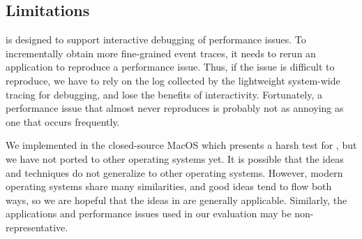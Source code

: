 \subsection{Limitations}

\xxx is designed to support interactive debugging of performance issues.  To
incrementally obtain more fine-grained event traces, it needs to rerun an
application to reproduce a performance issue.  Thus, if the issue is difficult
to reproduce, we have to rely on the log collected by the lightweight
system-wide tracing for debugging, and lose the benefits of interactivity.
Fortunately, a performance issue that almost never reproduces is probably not
as annoying as one that occurs frequently.

We implemented \xxx in the closed-source MacOS which presents a harsh test for
\xxx, but we have not ported \xxx to other operating systems yet.  It is
possible that the ideas and techniques do not generalize to other operating
systems.  However, modern operating systems share many similarities, and good
ideas tend to flow both ways, so we are hopeful that the ideas in \xxx are
generally applicable.  Similarly, the applications and performance issues used
in our evaluation may be non-representative.
